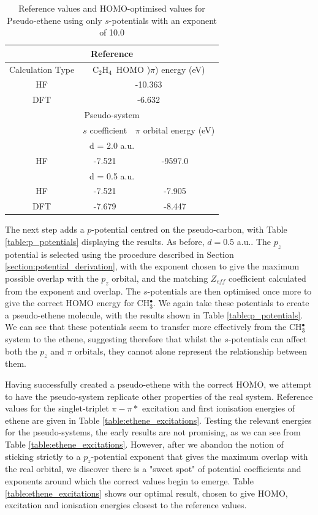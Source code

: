 \documentclass[journal=jctcce,manuscript=article]{achemso}
\begin{document}
\begin{table}[ht]
\caption{Reference values and HOMO-optimised values for Pseudo-ethene using only \(s\)-potentials with an exponent of 10.0}
\begin{tabular}{c c c}
\hline
\multicolumn{3}{c}{Reference} \\
\hline\hline
Calculation Type & \multicolumn{2}{c}{C\(_{2}\)H\(_{4}\)\ HOMO )\(\pi\)) energy (eV)} \\
\hline
HF & \multicolumn{2}{c}{-10.363} \\
DFT & \multicolumn{2}{c}{-6.632} \\
\hline
\multicolumn{3}{c}{Pseudo-system} \\
\hline\hline
 & \(s\) coefficient & \( \pi \) orbital energy (eV) \\
\hline
\multicolumn{3}{c}{d = 2.0 a.u.} \\
\hline
HF & -7.521 & -9597.0 \\
\hline
\multicolumn{3}{c}{d = 0.5 a.u.} \\
\hline
HF & -7.521 & -7.905 \\
DFT & -7.679 & -8.447 \\
\hline
\end{tabular}
\label{table:ethene_s_pseudo}
\end{table}

The next step adds a \(p\)-potential centred on the pseudo-carbon, with Table \ref{table:p_potentials} displaying the results. As before, \(d = 0.5\) a.u.. The \(p_{z}\) potential is selected using the procedure described in Section \ref{section:potential_derivation}, with the exponent chosen to give the maximum possible overlap with the \(p_{z}\) orbital, and the matching \(Z_{eff}\) coefficient calculated from the exponent and overlap. The \(s\)-potentials are then optimised once more to give the correct HOMO energy for CH\(^{\bullet}_{3}\). We again take these potentials to create a pseudo-ethene molecule, with the results shown in Table \ref{table:p_potentials}. We can see that these potentials seem to transfer more effectively from the CH\(^{\bullet}_{3}\) system to the ethene, suggesting therefore that whilst the \(s\)-potentials can affect both the \(p_{z}\) and \(\pi\) orbitals, they cannot alone represent the relationship between them.

Having successfully created a pseudo-ethene with the correct HOMO, we attempt to have the pseudo-system replicate other properties of the real system. Reference values for the singlet-triplet \(\pi-\pi*\) excitation and first ionisation energies of ethene are given in Table \ref{table:ethene_excitations}. Testing the relevant energies for the pseudo-systems, the early results are not promising, as we can see from Table \ref{table:ethene_excitations}. However, after we abandon the notion of sticking strictly to a \(p_{z}\)-potential exponent that gives the maximum overlap with the real orbital, we discover there is a "sweet spot" of potential coefficients and exponents around which the correct values begin to emerge. Table \ref{table:ethene_excitations} shows our optimal result, chosen to give HOMO, excitation and ionisation energies closest to the reference values. 
\end{document}
